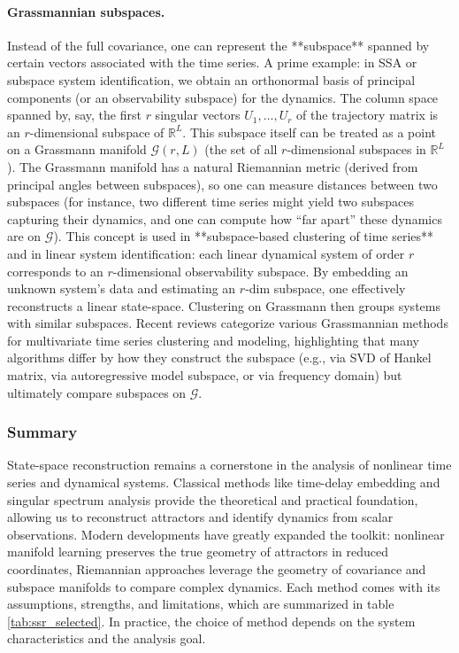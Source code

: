 \documentclass[14pt]{extarticle}
\begin{document}
	\paragraph{Grassmannian subspaces.}  
	Instead of the full covariance, one can represent the **subspace** spanned by certain vectors associated with the time series. A prime example: in SSA or subspace system identification, we obtain an orthonormal basis of principal components (or an observability subspace) for the dynamics. The column space spanned by, say, the first $r$ singular vectors $U_1,\dots,U_r$ of the trajectory matrix is an $r$-dimensional subspace of $\mathbb{R}^L$. This subspace itself can be treated as a point on a Grassmann manifold $\mathcal{G}(r, L)$ (the set of all $r$-dimensional subspaces in $\mathbb{R}^L$). The Grassmann manifold has a natural Riemannian metric (derived from principal angles between subspaces), so one can measure distances between two subspaces (for instance, two different time series might yield two subspaces capturing their dynamics, and one can compute how “far apart” these dynamics are on $\mathcal{G}$). This concept is used in **subspace-based clustering of time series** and in linear system identification: each linear dynamical system of order $r$ corresponds to an $r$-dimensional observability subspace. By embedding an unknown system’s data and estimating an $r$-dim subspace, one effectively reconstructs a linear state-space. Clustering on Grassmann then groups systems with similar subspaces. Recent reviews categorize various Grassmannian methods for multivariate time series clustering and modeling, highlighting that many algorithms differ by how they construct the subspace (e.g., via SVD of Hankel matrix, via autoregressive model subspace, or via frequency domain) but ultimately compare subspaces on $\mathcal{G}$.
	
	\subsubsection{Summary}
	
	State-space reconstruction remains a cornerstone in the analysis of nonlinear time series and dynamical systems.
	Classical methods like time-delay embedding and singular spectrum analysis provide the theoretical and practical foundation, allowing us to reconstruct attractors and identify dynamics from scalar observations.
	Modern developments have greatly expanded the toolkit: nonlinear manifold learning preserves the true geometry of attractors in reduced coordinates, Riemannian approaches leverage the geometry of covariance and subspace manifolds to compare complex dynamics.
	Each method comes with its assumptions, strengths, and limitations, which are summarized in table \ref{tab:ssr_selected}.
	In practice, the choice of method depends on the system characteristics  and the analysis goal.
	
\end{document}
